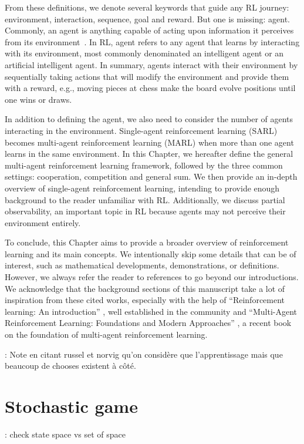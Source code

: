 From these definitions, we denote several keywords that guide any RL journey: environment, interaction, sequence, goal and reward.
But one is missing: agent.
Commonly, an agent is anything capable of acting upon information it perceives from its environment~\citep{russel2010}.
In RL, agent refers to any agent that learns by interacting with its environment, most commonly denominated an intelligent agent or an artificial intelligent agent.
In summary, agents interact with their environment by sequentially taking actions that will modify the environment and provide them with a reward, e.g., moving pieces at chess make the board evolve positions until one wins or draws.

In addition to defining the agent, we also need to consider the number of agents interacting in the environment.
Single-agent reinforcement learning (SARL) becomes multi-agent reinforcement learning (MARL) when more than one agent learns in the same environment.
In this Chapter, we hereafter define the general multi-agent reinforcement learning framework, followed by the three common settings: cooperation, competition and general sum.
We then provide an in-depth overview of single-agent reinforcement learning, intending to provide enough background to the reader unfamiliar with RL.
Additionally, we discuss partial observability, an important topic in RL because agents may not perceive their environment entirely.

To conclude, this Chapter aims to provide a broader overview of reinforcement learning and its main concepts.
We intentionally skip some details that can be of interest, such as mathematical developments, demonstrations, or definitions.
However, we always refer the reader to references to go beyond our introductions.
We acknowledge that the background sections of this manuscript take a lot of inspiration from these cited works, especially with the help of ``Reinforcement learning: An introduction'' \citep{sutton2018reinforcement}, well established in the community and ``Multi-Agent Reinforcement Learning: Foundations and Modern Approaches'' \citep{marl-book}, a recent book on the foundation of multi-agent reinforcement learning.

\todo: Note en citant russel et norvig qu'on considère que l'apprentissage mais que beaucoup de chooses existent à côté.

\section{Stochastic game}
\label{sec:ch2_stochastic_Game}
\todo: check state space vs set of space

